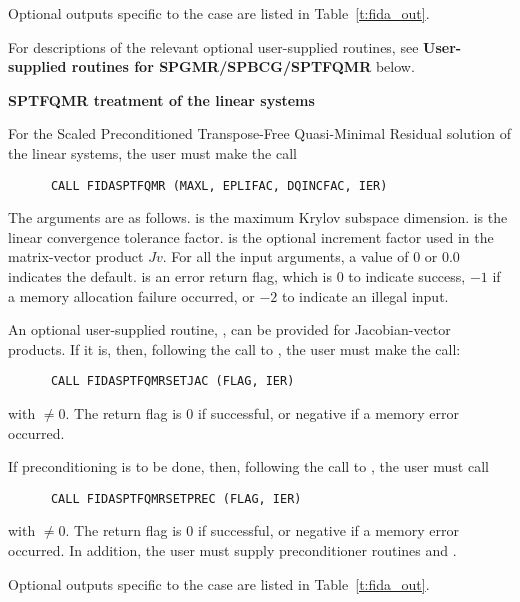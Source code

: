 \begin{Steps}
  Optional outputs specific to the {\spbcg} case are listed in
  Table~\ref{t:fida_out}.

  For descriptions of the relevant optional user-supplied routines, see 
  {\bf User-supplied routines for SPGMR/SPBCG/SPTFQMR} below.


  {\s}{\p} {\bf SPTFQMR treatment of the linear systems}
  
  For the Scaled Preconditioned Transpose-Free Quasi-Minimal Residual solution of
  the linear systems, the user must make the call
\begin{verbatim}
      CALL FIDASPTFQMR (MAXL, EPLIFAC, DQINCFAC, IER)
\end{verbatim}
  The arguments are as follows.
   is the maximum Krylov subspace dimension.
   is the linear convergence tolerance factor.
   is the optional increment factor used in the matrix-vector product
  $Jv$.
  For all the input arguments, a value of 0 or $0.0$ indicates the default.
   is an error return flag, which is $0$ to indicate success, $-1$
  if a memory allocation failure occurred, or $-2$ to indicate an illegal input.
  
  An optional user-supplied routine, , can be provided for
  Jacobian-vector products.  If it is, then, following the call to
  , the user must make the call:
\begin{verbatim}
      CALL FIDASPTFQMRSETJAC (FLAG, IER)
\end{verbatim}
  with  $\neq 0$.  The return flag  is 0 if successful,
  or negative if a memory error occurred.

  If preconditioning is to be done, then, following the
  call to , the user must call
\begin{verbatim}
      CALL FIDASPTFQMRSETPREC (FLAG, IER)
\end{verbatim}
  with  $\neq 0$.  The return flag  is 0 if successful,
  or negative if a memory error occurred.  In addition, the user must
  supply preconditioner routines  and .

  Optional outputs specific to the {\sptfqmr} case are listed in
  Table~\ref{t:fida_out}.


\end{Steps}
